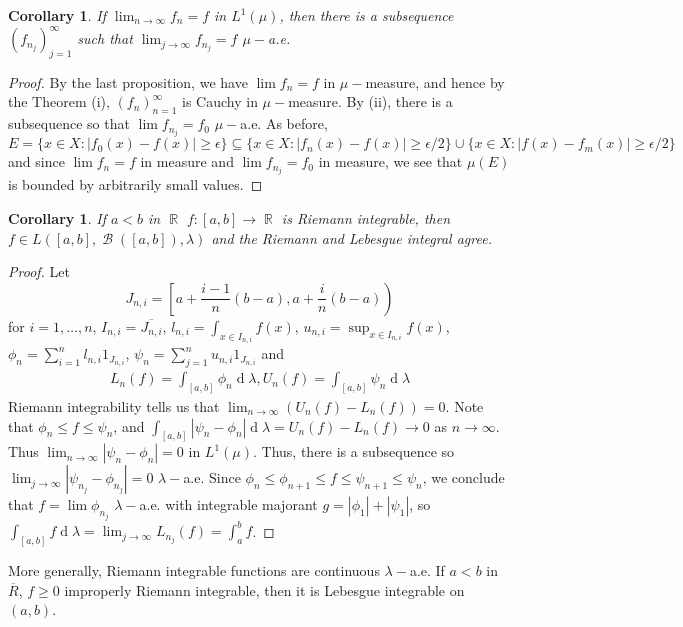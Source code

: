 \documentclass[12pt, a4paper]{memoir}
\DeclareMathOperator{\R}{{\mathbb{R}}}
\newtheorem{corollary}[theorem]{Corollary}
\theoremstyle{nonumberplain}
\newtheorem{proof}{Proof}
\DeclareMathOperator{\B}{\mathcal{B}}
\renewcommand{\d}[1]{\ensuremath{\operatorname{d}\!{#1}}} %
\begin{document}
\begin{corollary}
    If $\lim_{n\to\infty}f_n=f$ in $L^1(\mu)$, then there is a subsequence $(f_{n_j})_{j=1}^\infty$ such that $\lim_{j\to\infty}f_{n_j}=f$ $\mu-$a.e.
\end{corollary}
\begin{proof}
    By the last proposition, we have $\lim f_n=f$ in $\mu-$measure, and hence by the Theorem (i), $(f_n)_{n=1}^\infty$ is Cauchy in $\mu-$measure.
    By (ii), there is a subsequence so that $\lim f_{n_j}=f_0$ $\mu-$a.e.
    As before,
    \begin{equation*}
        E=\{x\in X:|f_0(x)-f(x)|\geq\epsilon\}\subseteq\{x\in X:|f_n(x)-f(x)|\geq\epsilon/2\}\cup\{x\in X:|f(x)-f_m(x)|\geq\epsilon/2\}
    \end{equation*}
    and since $\lim f_n=f$ in measure and $\lim f_{n_j}=f_0$ in measure, we see that $\mu(E)$ is bounded by arbitrarily small values.
\end{proof}
\begin{corollary}
    If $a<b$ in $\R$ $f:[a,b]\to\R$ is Riemann integrable, then $f\in L([a,b],\B([a,b]),\lambda)$ and the Riemann and Lebesgue integral agree.
\end{corollary}
\begin{proof}
    Let
    \begin{equation*}
        J_{n,i}=\left[a+\frac{i-1}{n}(b-a),a+\frac{i}{n}(b-a)\right)
    \end{equation*}
    for $i=1,\ldots,n$, $I_{n,i}=\overline{J_{n,i}}$, $l_{n,i}=\int_{x\in I_{n,i}}f(x)$, $u_{n,i}=\sup_{x\in I_{n,i}}f(x)$, $\phi_n=\sum_{i=1}^n l_{n,i}1_{J_{n,i}}$, $\psi_n=\sum_{j=1}^n u_{n,i}1_{J_{n,i}}$ and
    \begin{align*}
        L_n(f)=\int_{[a,b]}\phi_n\d{\lambda},U_n(f)=\int_{[a,b]}\psi_n\d{\lambda}
    \end{align*}
    Riemann integrability tells us that $\lim_{n\to\infty}(U_n(f)-L_n(f))=0$.
    Note that $\phi_n\leq f\leq\psi_n$, and $\int_{[a,b]}|\psi_n-\phi_n|\d{\lambda}=U_n(f)-L_n(f)\to 0$ as $n\to\infty$.
    Thus $\lim_{n\to\infty}|\psi_n-\phi_n|=0$ in $L^1(\mu)$.
    Thus, there is a subsequence so $\lim_{j\to\infty}|\psi_{n_j}-\phi_{n_j}|=0$ $\lambda-$a.e.
    Since $\phi_n\leq\phi_{n+1}\leq f\leq\psi_{n+1}\leq\psi_n$, we conclude that $f=\lim\phi_{n_j}$ $\lambda-$a.e. with integrable majorant $g=|\phi_1|+|\psi_1|$, so $\int_{[a,b]}f\d{\lambda}=\lim_{j\to\infty}L_{n_j}(f)=\int_a^b f$.
\end{proof}
More generally, Riemann integrable functions are continuous $\lambda-$a.e.
If $a<b$ in $\overline{R}$, $f\geq 0$ improperly Riemann integrable, then it is Lebesgue integrable on $(a,b)$.
\end{document}
